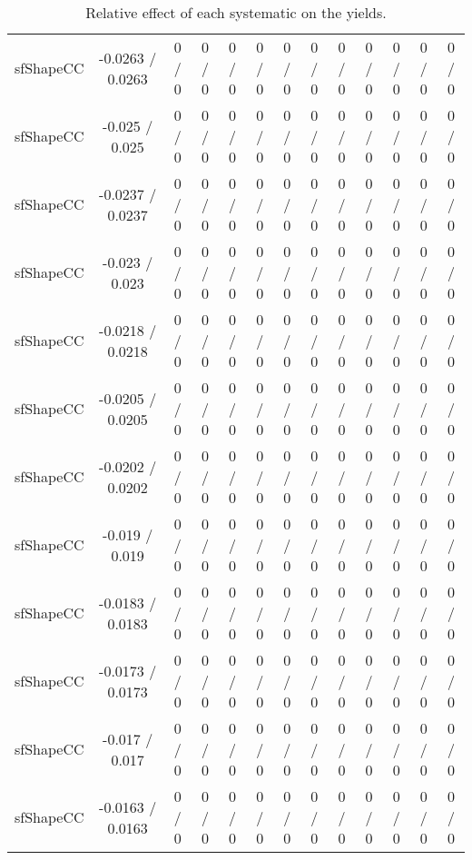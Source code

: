\documentclass[10pt]{article}
\begin{document}
\begin{table}[htbp]
\begin{center}
\begin{tabular}{|c|c|c|c|c|c|c|c|c|c|c|c|c|}
  sfShapeCC & -0.0263 / 0.0263 & 0 / 0 & 0 / 0 & 0 / 0 & 0 / 0 & 0 / 0 & 0 / 0 & 0 / 0 & 0 / 0 & 0 / 0 & 0 / 0 & 0 / 0 \\ 
  sfShapeCC & -0.025 / 0.025 & 0 / 0 & 0 / 0 & 0 / 0 & 0 / 0 & 0 / 0 & 0 / 0 & 0 / 0 & 0 / 0 & 0 / 0 & 0 / 0 & 0 / 0 \\ 
  sfShapeCC & -0.0237 / 0.0237 & 0 / 0 & 0 / 0 & 0 / 0 & 0 / 0 & 0 / 0 & 0 / 0 & 0 / 0 & 0 / 0 & 0 / 0 & 0 / 0 & 0 / 0 \\ 
  sfShapeCC & -0.023 / 0.023 & 0 / 0 & 0 / 0 & 0 / 0 & 0 / 0 & 0 / 0 & 0 / 0 & 0 / 0 & 0 / 0 & 0 / 0 & 0 / 0 & 0 / 0 \\ 
  sfShapeCC & -0.0218 / 0.0218 & 0 / 0 & 0 / 0 & 0 / 0 & 0 / 0 & 0 / 0 & 0 / 0 & 0 / 0 & 0 / 0 & 0 / 0 & 0 / 0 & 0 / 0 \\ 
  sfShapeCC & -0.0205 / 0.0205 & 0 / 0 & 0 / 0 & 0 / 0 & 0 / 0 & 0 / 0 & 0 / 0 & 0 / 0 & 0 / 0 & 0 / 0 & 0 / 0 & 0 / 0 \\ 
  sfShapeCC & -0.0202 / 0.0202 & 0 / 0 & 0 / 0 & 0 / 0 & 0 / 0 & 0 / 0 & 0 / 0 & 0 / 0 & 0 / 0 & 0 / 0 & 0 / 0 & 0 / 0 \\ 
  sfShapeCC & -0.019 / 0.019 & 0 / 0 & 0 / 0 & 0 / 0 & 0 / 0 & 0 / 0 & 0 / 0 & 0 / 0 & 0 / 0 & 0 / 0 & 0 / 0 & 0 / 0 \\ 
  sfShapeCC & -0.0183 / 0.0183 & 0 / 0 & 0 / 0 & 0 / 0 & 0 / 0 & 0 / 0 & 0 / 0 & 0 / 0 & 0 / 0 & 0 / 0 & 0 / 0 & 0 / 0 \\ 
  sfShapeCC & -0.0173 / 0.0173 & 0 / 0 & 0 / 0 & 0 / 0 & 0 / 0 & 0 / 0 & 0 / 0 & 0 / 0 & 0 / 0 & 0 / 0 & 0 / 0 & 0 / 0 \\ 
  sfShapeCC & -0.017 / 0.017 & 0 / 0 & 0 / 0 & 0 / 0 & 0 / 0 & 0 / 0 & 0 / 0 & 0 / 0 & 0 / 0 & 0 / 0 & 0 / 0 & 0 / 0 \\ 
  sfShapeCC & -0.0163 / 0.0163 & 0 / 0 & 0 / 0 & 0 / 0 & 0 / 0 & 0 / 0 & 0 / 0 & 0 / 0 & 0 / 0 & 0 / 0 & 0 / 0 & 0 / 0 \\ 
\hline 
\end{tabular} 
\caption{Relative effect of each systematic on the yields.} 
\end{center} 
\end{table} 
\end{document}
